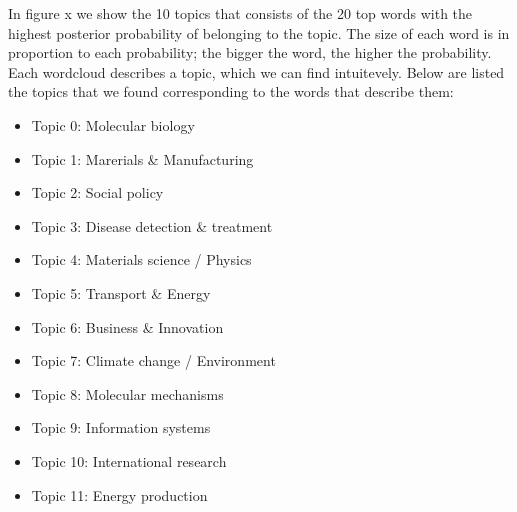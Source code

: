 \documentclass[12pt]{report}
\begin{document}
In figure x we show the 10 topics that consists of the 20 top words with the
highest posterior probability of belonging to the topic. The size of each word
is in proportion to each probability; the bigger the word, the higher the
probability. Each wordcloud describes a topic, which we can find intuitevely.
Below are listed the topics that we found corresponding to the words that
describe them:
\begin{itemize}
\item[] Topic 0: Molecular biology
\item[] Topic 1: Marerials \& Manufacturing
\item[] Topic 2: Social policy
\item[] Topic 3: Disease detection \& treatment
\item[] Topic 4: Materials science / Physics
\item[] Topic 5: Transport \& Energy
\item[] Topic 6: Business \& Innovation
\item[] Topic 7: Climate change / Environment
\item[] Topic 8: Molecular mechanisms
\item[] Topic 9: Information systems
\item[] Topic 10: International research
\item[] Topic 11: Energy production
\end{itemize}
\end{document}
